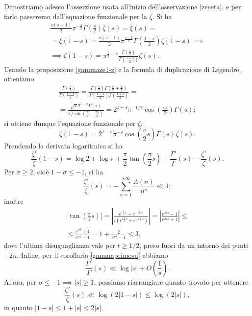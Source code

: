 Dimostriamo adesso l'asserzione usata all'inizio dell'osservazione \ref{zeeeta}, e per farlo passeremo dall'equazione funzionale per la $\zeta$. Si ha
\begin{gather*}
  \frac{s(s-1)}{2}\pi^{-\frac{s}{2}}\Gamma\left(\frac{s}{2}\right)\zeta(s)=\xi(s)= \\
  =\xi(1-s)=\frac{s(s-1)}{2}\pi^{\frac{s-1}{2}}\Gamma\left(\frac{1-s}{2}\right)\zeta(1-s) \implies \\
  \implies \zeta(1-s)=\pi^{\frac{1}{2}-s}\frac{\Gamma\left(\frac{s}{2}\right)}{\Gamma\left(\frac{1-s}{2}\right)}\zeta(s).
\end{gather*}
Usando la proposizione \ref{gammaze1-z} e la formula di duplicazione di Legendre, otteniamo
\begin{gather*}
  \frac{\Gamma\left(\frac{s}{2}\right)}{\Gamma\left(\frac{1-s}{2}\right)}=\frac{\Gamma\left(\frac{s}{2}\right)\Gamma\left(\frac{s}{2}+\frac{1}{2}\right)}{\Gamma\left(\frac{1-s}{2}\right)\Gamma\left(\frac{1+s}{2}\right)}= \\
  =\frac{\sqrt{\pi}2^{1-s}\Gamma(s)}{\pi/\sin\left(\frac{\pi}{2}-\frac{\pi s}{2}\right)}=2^{1-s}\pi^{-1/2}\cos\left(\frac{\pi s}{2}\right)\Gamma(s);
\end{gather*}
si ottiene dunque l'equazione funzionale per $\zeta$:
\begin{equation} \label{eqfunzeta}
  \zeta(1-s)=2^{1-s}\pi^{-s}\cos\left(\frac{\pi}{2}s\right)\Gamma(s)\zeta(s).
\end{equation}
Prendendo la derivata logaritmica si ha
$$\frac{\zeta'}{\zeta}(1-s)=\log{2}+\log{\pi}+\frac{\pi}{2}\tan\left(\frac{\pi}{2}s\right)-\frac{\Gamma'}{\Gamma}(s)-\frac{\zeta'}{\zeta}(s).$$
Per $\sigma \ge 2$, cioè $1-\sigma \le -1$, si ha
$$\frac{\zeta'}{\zeta}(s)=-\sum_{n=1}^{+\infty} \frac{\Lambda(n)}{n^s} \ll 1;$$
inoltre
\begin{gather*}
  \left|\tan\left(\frac{\pi}{2}s\right)\right|=\left|\frac{e^{i\frac{\pi}{2}s}-e^{-i\frac{\pi}{2}s}}{i(e^{i\frac{\pi}{2}s}+e^{-i\frac{\pi}{2}s})}\right|=\left|\frac{e^{\pi is}-1}{e^{\pi is}+1}\right| \le \\
  \le \frac{e^{\pi t}+1}{e^{\pi t}-1}=1+\frac{2}{e^{\pi t}-1} \le 3,
\end{gather*}
dove l'ultima disuguaglianza vale per $t \ge 1/2$, preso fuori da un intorno dei punti $-2n$. Infine, per il corollario \ref{gammaprimosu} abbiamo
$$\frac{\Gamma'}{\Gamma}(s) \ll \log{|s|}+O\left(\frac{1}{s}\right).$$
Allora, per $\sigma \le -1 \implies |s| \ge 1$, possiamo riarrangiare quanto trovato per ottenere
$$\frac{\zeta'}{\zeta}(s) \ll \log(2|1-s|) \le \log(2|s|),$$
in quanto $|1-s| \le 1+|s| \le 2|s|$.

